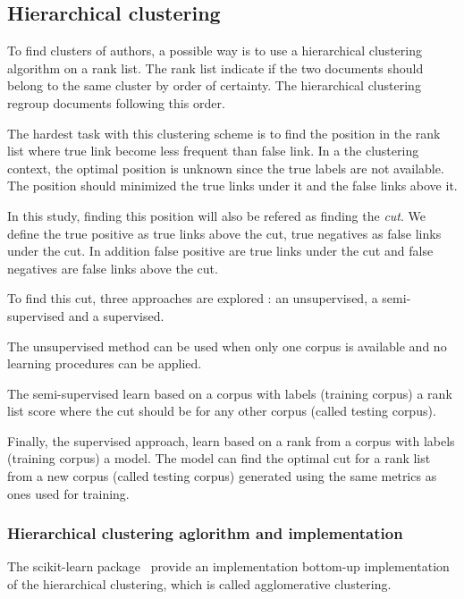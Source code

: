 \subsection{Hierarchical clustering \label{sec:authorship_clustering_methods}}

To find clusters of authors, a possible way is to use a hierarchical clustering algorithm on a rank list.
The rank list indicate if the two documents should belong to the same cluster by order of certainty.
The hierarchical clustering regroup documents following this order.

The hardest task with this clustering scheme is to find the position in the rank list where true link become less frequent than false link.
In a the clustering context, the optimal position is unknown since the true labels are not available.
The position should minimized the true links under it and the false links above it.

In this study, finding this position will also be refered as finding the \textit{cut}.
We define the true positive as true links above the cut, true negatives as false links under the cut.
In addition false positive are true links under the cut and false negatives are false links above the cut.

To find this cut, three approaches are explored : an unsupervised, a semi-supervised and a supervised.

The unsupervised method can be used when only one corpus is available and no learning procedures can be applied.

The semi-supervised learn based on a corpus with labels (training corpus) a rank list score where the cut should be for any other corpus (called testing corpus).

Finally, the supervised approach, learn based on a rank from a corpus with labels (training corpus) a model.
The model can find the optimal cut for a rank list from a new corpus (called testing corpus) generated using the same metrics as ones used for training.

\subsubsection{Hierarchical clustering aglorithm and implementation}

The scikit-learn package~\cite{sklearn} provide an implementation bottom-up implementation of the hierarchical clustering, which is called agglomerative clustering.

